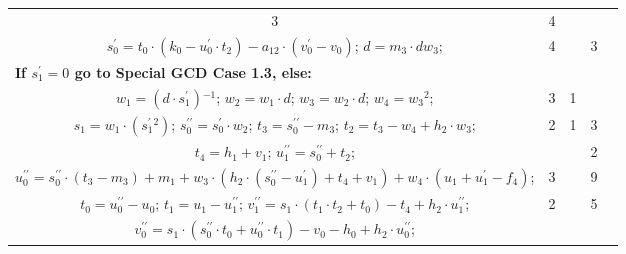 \begin{tabular}{|c|cr|c|c|c|c|}
{} & 3 &  & 4 & \\
\multicolumn{3}{|R{340pt}|}{ 
$s^{\prime}_{0}=t_{0} \cdot (k_{0}-u^{\prime}_{0} \cdot t_{2})-a_{12} \cdot (v^{\prime}_{0}-v_{0})$;\hspace{4pt}
$d=m_{3} \cdot dw_{3}$;\hspace{4pt}
} & 4 &  & 3 & \\
\multicolumn{3}{|l|}{ 
 \bf{If $s^{\prime}_{1} = 0$ go to Special GCD Case 1.3, else:} } &  &  &  & \\
\multicolumn{3}{|R{340pt}|}{ 
$w_{1}=(d \cdot s^{\prime}_{1}){}^{-1}$;\hspace{4pt}
$w_{2}=w_{1} \cdot d$;\hspace{4pt}
$w_{3}=w_{2} \cdot d$;\hspace{4pt}
$w_{4}=w_{3}{}^{2}$;\hspace{4pt}
} & 3 & 1 &  & \\
\multicolumn{3}{|R{340pt}|}{ 
$s_{1}=w_{1} \cdot (s^{\prime}_{1}{}^{2})$;\hspace{4pt}
$s^{\prime\prime}_{0}=s^{\prime}_{0} \cdot w_{2}$;\hspace{4pt}
$t_{3}=s^{\prime\prime}_{0}-m_{3}$;\hspace{4pt}
$t_{2}=t_{3}-w_{4}+h_{2} \cdot w_{3}$;\hspace{4pt}
} & 2 & 1 & 3 & \\
\multicolumn{3}{|R{340pt}|}{ 
$t_{4}=h_{1}+v_{1}$;\hspace{4pt}
$u^{\prime\prime}_{1}=s^{\prime\prime}_{0}+t_{2}$;\hspace{4pt}
} &  &  & 2 & \\
\multicolumn{3}{|R{340pt}|}{ 
$u^{\prime\prime}_{0}=s^{\prime\prime}_{0} \cdot (t_{3}-m_{3})+m_{1}+w_{3} \cdot (h_{2} \cdot (s^{\prime\prime}_{0}-u^{\prime}_{1})+t_{4}+v_{1})+w_{4} \cdot (u_{1}+u^{\prime}_{1}-f_{4})$;\hspace{4pt}
} & 3 &  & 9 & \\
\multicolumn{3}{|R{340pt}|}{ 
$t_{0}=u^{\prime\prime}_{0}-u_{0}$;\hspace{4pt}
$t_{1}=u_{1}-u^{\prime\prime}_{1}$;\hspace{4pt}
$v^{\prime\prime}_{1}=s_{1} \cdot (t_{1} \cdot t_{2}+t_{0})-t_{4}+h_{2} \cdot u^{\prime\prime}_{1}$;\hspace{4pt}
} & 2 &  & 5 & \\
\multicolumn{3}{|R{340pt}|}{ 
$v^{\prime\prime}_{0}=s_{1} \cdot (s^{\prime\prime}_{0} \cdot t_{0}+u^{\prime\prime}_{0} \cdot t_{1})-v_{0}-h_{0}+h_{2} \cdot u^{\prime\prime}_{0}$;\hspace{4pt}
}
\end{tabular}
